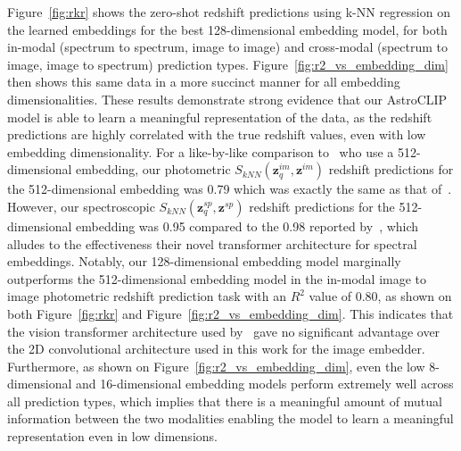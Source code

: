 Figure~\eqref{fig:rkr} shows the zero-shot redshift predictions using k-NN regression on the learned embeddings for
the best 128-dimensional embedding model, for both in-modal (spectrum to spectrum, image to image) and cross-modal (spectrum to image,
image to spectrum) prediction types.
Figure~\eqref{fig:r2_vs_embedding_dim} then shows this same data in a more succinct manner for all embedding dimensionalities.
These results demonstrate strong evidence that our AstroCLIP model is able to learn a meaningful representation of the
data, as the redshift predictions are highly correlated with the true redshift values, even with low embedding dimensionality.
For a like-by-like comparison to~\cite{astroclip} who use a 512-dimensional embedding, our photometric
$S_{kNN}(\mathbf{z}_{q}^{im}, \mathbf{z}^{im})$ redshift predictions for the 512-dimensional embedding was 0.79 which was
exactly the same as that of~\cite{astroclip}.
However, our spectroscopic $S_{kNN}(\mathbf{z}_{q}^{sp}, \mathbf{z}^{sp})$ redshift predictions for the 512-dimensional
embedding was 0.95 compared to the 0.98 reported by~\cite{astroclip}, which alludes to the effectiveness their novel
transformer architecture for spectral embeddings.
Notably, our 128-dimensional embedding model marginally outperforms the 512-dimensional embedding model in the in-modal
image to image photometric redshift prediction task with an $R^{2}$ value of 0.80, as shown on both Figure~\eqref{fig:rkr}
and Figure~\eqref{fig:r2_vs_embedding_dim}.
This indicates that the vision transformer architecture used by~\cite{astroclip} gave no significant advantage over the
2D convolutional architecture used in this work for the image embedder.
Furthermore, as shown on Figure~\eqref{fig:r2_vs_embedding_dim}, even the low 8-dimensional and 16-dimensional embedding
models perform extremely well across all prediction types, which implies that there is a meaningful amount of mutual
information between the two modalities enabling the model to learn a meaningful representation even in low dimensions.

